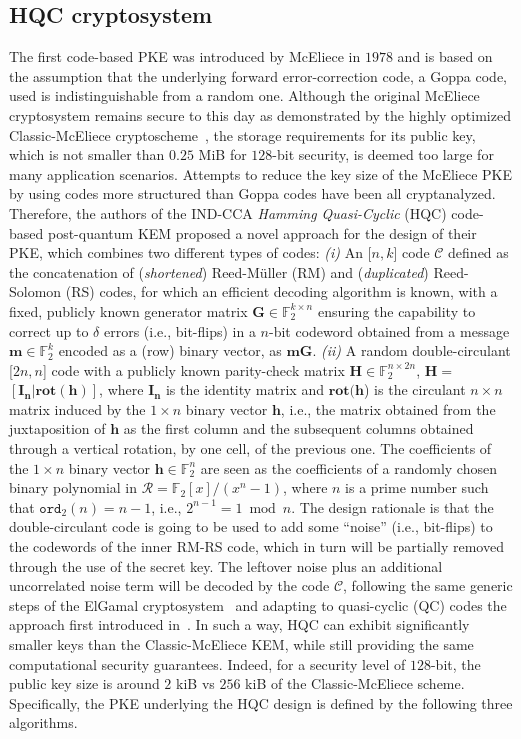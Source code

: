 \subsection{HQC cryptosystem}
The first code-based PKE was introduced by McEliece in $1978$ and is based on the 
assumption that the underlying forward error-correction code, a Goppa code, used 
is indistinguishable from a random one. Although the original McEliece 
cryptosystem remains secure to this day as demonstrated by the 
highly optimized Classic-McEliece cryptoscheme~\cite{ClassicMcEliece}, the storage 
requirements for its public key, which is not smaller than $0.25$ MiB for $128$-bit 
security, is deemed too large for many application scenarios. Attempts to reduce 
the key size of the McEliece PKE by using codes more structured than Goppa codes have been all cryptanalyzed.
Therefore, the authors of the IND-CCA {\em Hamming Quasi-Cyclic} (HQC) code-based 
post-quantum KEM proposed a novel approach for the design of their PKE, which 
combines two different types of codes:
{\em (i)} An [$n, k$] code $\mathcal{C}$ defined as the concatenation of 
({\em shortened}) Reed-M\"{u}ller (RM) and ({\em duplicated}) Reed-Solomon (RS) codes, 
for which an efficient decoding algorithm is known, with a fixed, publicly known 
generator matrix $\mathbf{G} \in \mathbb{F}_2^{k \times n}$ ensuring the capability 
to correct up to $\delta$ errors (i.e., bit-flips) in a $n$-bit codeword obtained 
from a message $\mathbf{m} \in \mathbb{F}_2^k$ encoded as a (row) binary vector, as 
$\mathbf{m}\mathbf{G}$. 
{\em (ii)} A random double-circulant [$2n, n$] code with a publicly
known parity-check matrix $\mathbf{H}$$\in$$\mathbb{F}_2^{n \times 2n}$, 
$\mathbf{H}$$=$$[\mathbf{I_n} | \mathbf{rot}(\mathbf{h})]$, where $\mathbf{I_n}$ 
is the identity matrix and $\mathbf{rot}(\mathbf{h}$) is the circulant 
$n \times n$ matrix induced by the $1 \times n$  binary vector $\mathbf{h}$, 
i.e., the matrix obtained from the juxtaposition of $\mathbf{h}$ as the first 
column and the subsequent columns obtained through a vertical rotation, by one 
cell, of the previous one. 
The coefficients of the $1 \times n$  binary vector $\mathbf{h} \in \mathbb{F}_2^n$ are seen as the coefficients of a randomly chosen binary polynomial in 
$\mathcal{R}=\mathbb{F}_2[x]/(x^n-1)$, where $n$ is a prime number such that 
$\mathtt{ord}_2(n) = n-1$, i.e., $2^{n-1} = 1 \bmod n$.
%
The design rationale is that the double-circulant code is going to be used to 
add some ``noise'' (i.e., bit-flips) to the codewords of the inner RM-RS code, 
which in turn will be partially removed through the use of the secret key. The 
leftover noise plus an additional uncorrelated noise term will be decoded by the 
code $\mathcal{C}$, following the same generic steps of the ElGamal 
cryptosystem~\cite{DBLP:journals/tit/Elgamal85} and adapting to quasi-cyclic (QC) 
codes the approach first introduced in~\cite{DBLP:conf/focs/Alekhnovich03}. In such 
a way, HQC can exhibit significantly smaller keys than the Classic-McEliece KEM, 
while still providing the same computational security guarantees. Indeed, for a 
security level of $128$-bit, the public key size is around $2$ kiB vs $256$ kiB 
of the Classic-McEliece scheme.
Specifically, the PKE underlying the HQC design is defined by the following three algorithms.

